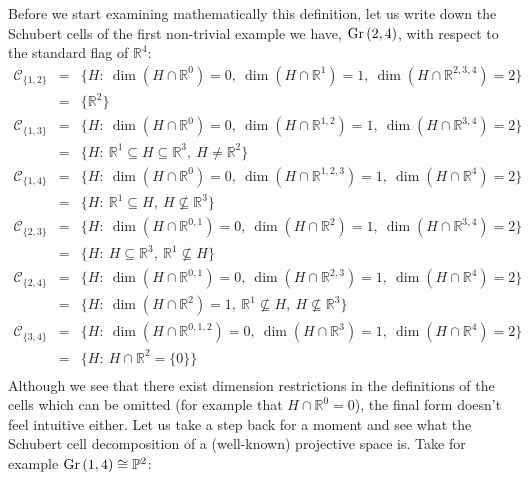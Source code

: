 Before we start examining mathematically this definition, let us write down the Schubert cells of the first non-trivial example we have, $\Gr{2}{4}$, with respect to the standard flag of $\mathbb{R}^4$:
$$\begin{array}{rcl}
\mathcal{C}_{\{1,2\}}&=&\big\{H:\ \dim(H\cap\mathbb{R}^{0})=0,\ \dim(H\cap\mathbb{R}^{1})=1,\ \dim(H\cap\mathbb{R}^{2,3,4})=2\big\}\\
&=&\big\{\mathbb{R}^2\big\}\\[.6em]
\mathcal{C}_{\{1,3\}}&=&\big\{H:\ \dim(H\cap\mathbb{R}^{0})=0,\ \dim(H\cap\mathbb{R}^{1,2})=1,\ \dim(H\cap\mathbb{R}^{3,4})=2\big\}\\
&=&\big\{H:\ \mathbb{R}^1\subseteq H\subseteq\mathbb{R}^3,\ H\neq\mathbb{R}^2\big\}\\[.6em]
\mathcal{C}_{\{1,4\}}&=&\big\{H:\ \dim(H\cap\mathbb{R}^{0})=0,\ \dim(H\cap\mathbb{R}^{1,2,3})=1,\ \dim(H\cap\mathbb{R}^{4})=2\big\}\\
&=&\big\{H:\ \mathbb{R}^1\subseteq H,\ H\not\subseteq\mathbb{R}^3\big\}\\[.6em]
\mathcal{C}_{\{2,3\}}&=&\big\{H:\ \dim(H\cap\mathbb{R}^{0,1})=0,\ \dim(H\cap\mathbb{R}^{2})=1,\ \dim(H\cap\mathbb{R}^{3,4})=2\big\}\\
&=&\big\{H:\ H\subseteq\mathbb{R}^3,\ \mathbb{R}^1\not\subseteq H\big\}\\[.6em]
\mathcal{C}_{\{2,4\}}&=&\big\{H:\ \dim(H\cap\mathbb{R}^{0,1})=0,\ \dim(H\cap\mathbb{R}^{2,3})=1,\ \dim(H\cap\mathbb{R}^{4})=2\big\}\\
&=&\big\{H:\ \dim(H\cap\mathbb{R}^2)=1,\ \mathbb{R}^1\not\subseteq H,\ H\not\subseteq\mathbb{R}^3\big\}\\[.6em]
\mathcal{C}_{\{3,4\}}&=&\big\{H:\ \dim(H\cap\mathbb{R}^{0,1,2})=0,\ \dim(H\cap\mathbb{R}^{3})=1,\ \dim(H\cap\mathbb{R}^{4})=2\big\}\\
&=&\big\{H:\ H\cap\mathbb{R}^2=\{0\}\big\}\\[.6em]
\end{array}$$
Although we see that there exist dimension restrictions in the definitions of the cells which can be omitted (for example that $H\cap\mathbb{R}^0=0$), the final form doesn't feel intuitive either. Let us take a step back for a moment and see what the Schubert cell decomposition of a (well-known) projective space is. Take for example $\Gr{1}{4}\cong\mathbb{P}^2$:
